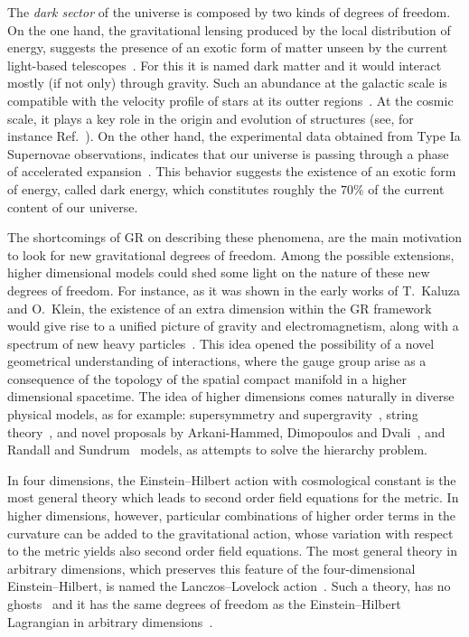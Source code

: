 \documentclass[aps,prd,12pt,superscriptaddress,showpacs,showkeys,longbibliography,reprint,nofootinbib]{revtex4-1}
\begin{document}
The \emph{dark sector} of the universe is composed by two kinds of degrees of freedom. On the one hand, the gravitational lensing produced by the local distribution of energy, suggests the presence of an exotic form of matter unseen by the current light-based telescopes~\cite{Wittman:2000tc}. For this it is named dark matter and it would interact mostly (if not only) through gravity. Such an abundance at the galactic scale is compatible with the velocity profile of stars at its outter regions~\cite{Sofue:2000jx}. At the cosmic scale, it plays a key role in the origin and evolution of structures (see, for instance Ref.~\cite{DelPopolo:2008mr}). On the other hand, the experimental data obtained from Type Ia Supernovae observations, indicates that our universe is passing through a phase of accelerated expansion~\cite{Riess:1998cb}. This behavior suggests the existence of an exotic form of energy, called dark energy, which constitutes roughly the $70\%$ of the current content of our universe.  

The shortcomings of GR on describing these phenomena, are the main motivation to look for new gravitational degrees of freedom. Among the possible extensions, higher dimensional models could shed some light on the nature of these new degrees of freedom. For instance, as it was shown in the early works of T.~Kaluza and O.~Klein, the existence of an extra dimension within the GR framework would give rise to a unified picture of gravity and electromagnetism, along with a spectrum of new heavy particles~\cite{Kaluza:1921tu,*Klein:1926tv}. This idea opened the possibility of a novel geometrical understanding of interactions, where the gauge group arise as a consequence of the topology of the spatial compact manifold in a higher dimensional spacetime. The idea of higher dimensions comes naturally in diverse physical models, as for example: supersymmetry and supergravity~\cite{supergravity}, string theory~\cite{Green:1987sp,*Green:1987mn}, and novel proposals by Arkani-Hammed, Dimopoulos and Dvali~\cite{ArkaniHamed:1998rs,*Antoniadis:1998ig}, and Randall and Sundrum~\cite{Randall:1999ee,*Randall:1999vf} models, as attempts to solve the hierarchy problem.

In four dimensions, the Einstein--Hilbert action with cosmological constant is the most general theory which leads to second order field equations for the metric. In higher dimensions, however, particular combinations of higher order terms in the curvature can be added to the gravitational action, whose variation with respect to the metric yields also second order field equations. The most general theory in arbitrary dimensions, which preserves this feature of the four-dimensional Einstein--Hilbert, is named the Lanczos--Lovelock action~\cite{Lanczos:1938sf,*Lovelock:1971yv}. Such a theory, has no ghosts~\cite{Zumino:1985dp} and it has the same degrees of freedom as the Einstein--Hilbert Lagrangian in arbitrary dimensions~\cite{Henneaux:1990au}.
\end{document}
